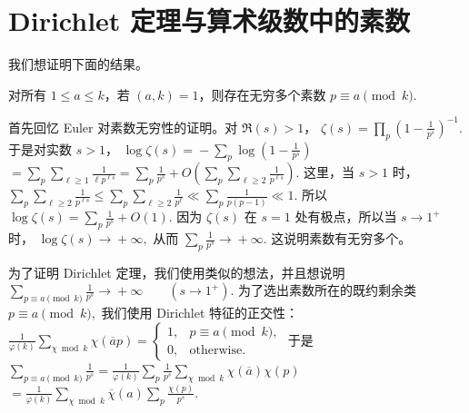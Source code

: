 \chapter{Dirichlet 定理与算术级数中的素数}
\label{chap:dirichlet-theorem-arithmetic-progressions}

我们想证明下面的结果。

\begin{theorem}[Dirichlet]
	对所有 $1\leq a\leq k$，若 $(a,k)=1$，则存在无穷多个素数
	\(\textstyle p\equiv\allowbreak{} a\pmod k.\)
\end{theorem}

首先回忆 Euler 对素数无穷性的证明。对 $\Re(s)>1$，
\(\textstyle \zeta(s)=\allowbreak{}\prod_p\left(1-\frac{1}{p^s}\right)^{-1}.\)
于是对实数 $s>1$，
\(\textstyle \log\zeta(s) =\allowbreak{} -\sum_p\log\left(1-\frac{1}{p^s}\right)\) \(\textstyle =\allowbreak{} \sum_p\sum_{\ell\geq\allowbreak{} 1}\frac{1}{\ell p^{\ell s}} =\allowbreak{} \sum_p\frac{1}{p^s} +\allowbreak{} O\left(\sum_p\sum_{\ell\geq\allowbreak{} 2}\frac{1}{p^{\ell s}}\right).\)
这里，当 $s>1$ 时，
\(\textstyle \sum_p\sum_{\ell\geq\allowbreak{} 2}\frac{1}{p^{\ell s}} \leq\allowbreak{} \sum_p\sum_{\ell\geq\allowbreak{} 2}\frac{1}{p^\ell} \ll\allowbreak{} \sum_p\frac{1}{p(p-1)} \ll\allowbreak{} 1.\)
所以
\(\textstyle \log\zeta(s)=\allowbreak{}\sum_p\frac{1}{p^s}+\allowbreak{}O(1).\)
因为 $\zeta(s)$ 在 $s=1$ 处有极点，所以当 $s\to 1^+$ 时，
\(\textstyle \log\zeta(s)\to\allowbreak{} +\allowbreak{}\infty,\allowbreak{}\)
从而
\(\textstyle \sum_p\frac{1}{p^s}\to\allowbreak{}+\allowbreak{}\infty.\)
这说明素数有无穷多个。

为了证明 Dirichlet 定理，我们使用类似的想法，并且想说明
\(\textstyle \sum_{p\equiv\allowbreak{} a\pmod k}\frac{1}{p^s} \longrightarrow\allowbreak{} +\allowbreak{}\infty \qquad (s\to\allowbreak{} 1^+\allowbreak{}).\)
为了选出素数所在的既约剩余类
\(\textstyle p\equiv\allowbreak{} a\pmod k,\allowbreak{}\)
我们使用 Dirichlet 特征的正交性：
\(\textstyle \frac{1}{\varphi(k)} \sum_{\chi\bmod k}\chi(\overline{a}p) = \begin{cases} 1, & p\equiv a\pmod k,\\ 0, & \text{otherwise}. \end{cases}\)
于是
\(\textstyle \sum_{p\equiv\allowbreak{} a\pmod k}\frac{1}{p^s} =\allowbreak{} \frac{1}{\varphi(k)} \sum_p\frac{1}{p^s} \sum_{\chi\bmod k}\chi(\overline{a})\chi(p)\) \(\textstyle =\allowbreak{} \frac{1}{\varphi(k)} \sum_{\chi\bmod k}\overline{\chi}(a) \sum_p\frac{\chi(p)}{p^s}.\)

